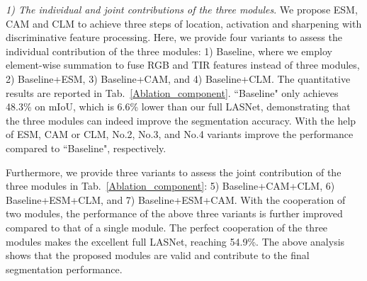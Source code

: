\documentclass[journal]{IEEEtran}
\begin{document}
\textit{1) The individual and joint contributions of the three modules}.
We propose ESM, CAM and CLM to achieve three steps of location, activation and sharpening with discriminative feature processing.
Here, we provide four variants to assess the individual contribution of the three modules:
1) Baseline, where we employ element-wise summation to fuse RGB and TIR features instead of three modules,
2) Baseline+ESM, 
3) Baseline+CAM, and
4) Baseline+CLM.
The quantitative results are reported in Tab.~\ref{Ablation_component}.
``Baseline" only achieves 48.3\% on mIoU, which is 6.6\% lower than our full LASNet, demonstrating that the three modules can indeed improve the segmentation accuracy.
With the help of ESM, CAM or CLM, No.2, No.3, and No.4 variants improve the performance compared to ``Baseline", respectively.


Furthermore, we provide three variants to assess the joint contribution of the three modules in Tab.~\ref{Ablation_component}:
5) Baseline+CAM+CLM, 
6) Baseline+ESM+CLM, and
7) Baseline+ESM+CAM.
With the cooperation of two modules, the performance of the above three variants is further improved compared to that of a single module.
The perfect cooperation of the three modules makes the excellent full LASNet, reaching 54.9\%.
The above analysis shows that the proposed modules are valid and contribute to the final segmentation performance.
\end{document}
